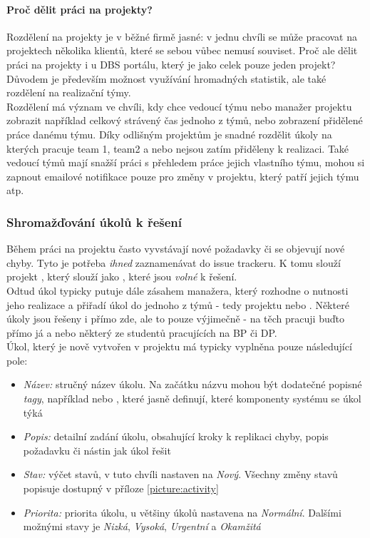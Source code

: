 \paragraph{Proč dělit práci na projekty?}
Rozdělení na projekty je v běžné firmě jasné: v jednu chvíli se může pracovat na projektech několika klientů, které se sebou vůbec nemusí souviset. Proč ale dělit práci na projekty i u DBS portálu, který je jako celek pouze jeden projekt? Důvodem je především možnost využívání hromadných statistik, ale také rozdělení na realizační týmy.\\
Rozdělení má význam ve chvíli, kdy chce vedoucí týmu nebo manažer projektu zobrazit například celkový strávený čas jednoho z týmů, nebo zobrazení přidělené práce danému týmu. Díky odlišným projektům je snadné rozdělit úkoly na kterých pracuje team 1, team2 a nebo nejsou zatím přiděleny k realizaci. Také vedoucí týmů mají snažší práci s přehledem práce jejich vlastního týmu, mohou si zapnout emailové notifikace pouze pro změny v projektu, který patří jejich týmu atp.

\subsubsection{Shromažďování úkolů k řešení}

Během práci na projektu často vyvstávají nové požadavky či se objevují nové chyby. Tyto je potřeba \emph{ihned} zaznamenávat do issue trackeru. K tomu slouží projekt , který slouží jako , které jsou \emph{volné} k řešení.\\
Odtud úkol typicky putuje dále zásahem manažera, který rozhodne o nutnosti jeho realizace a přiřadí úkol do jednoho z týmů - tedy projektu  nebo . Některé úkoly jsou řešeny i přímo zde, ale to pouze výjimečně - na těch pracuji buďto přímo já a nebo některý ze studentů pracujících na BP či DP.\\
Úkol, který je nově vytvořen v  projektu má typicky vyplněna pouze následující pole:
\begin{itemize}
	\item \emph{Název:} stručný název úkolu. Na začátku názvu mohou být dodatečné popisné \emph{tagy}, například \code{[databaze]} nebo \code{[menu]}, které jasně definují, které komponenty systému se úkol týká
	\item \emph{Popis:} detailní zadání úkolu, obsahující kroky k replikaci chyby, popis požadavku či nástin jak úkol řešit
	\item \emph{Stav:} výčet stavů, v tuto chvíli nastaven na \emph{Nový}. Všechny změny stavů popisuje  dostupný v příloze \ref{picture:activity}
	\item \emph{Priorita:} priorita úkolu, u většiny úkolů nastavena na \emph{Normální}. Dalšími možnými stavy je \emph{Nizká}, \emph{Vysoká}, \emph{Urgentní} a \emph{Okamžitá}\\
\end{itemize}


